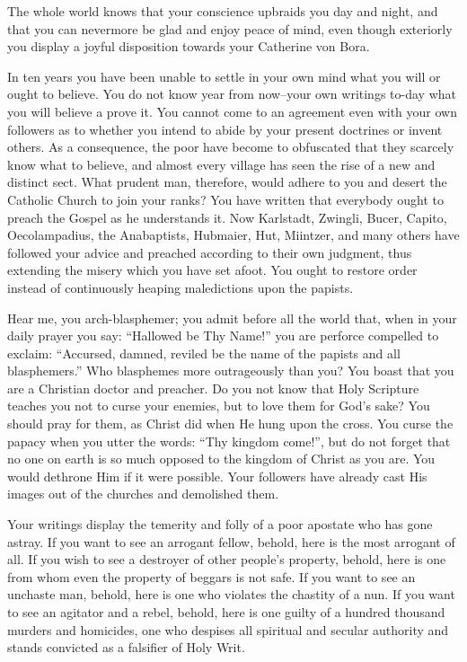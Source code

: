 The whole world knows that your conscience upbraids you day and night,
and that you can nevermore be glad and enjoy peace of mind, even though
exteriorly you display a joyful disposition towards your Catherine von Bora.

In ten years you have been unable to settle in your own mind what you
will or ought to believe. You do not know year from now--your own writings
to-day what you will believe a prove it. You cannot come to an agreement
even with your own followers as to whether you intend to abide by
your present doctrines or invent others. As a consequence, the poor have
become to obfuscated that they scarcely know what to believe, and
almost every village has seen the rise of a new and distinct sect. What
prudent man, therefore, would adhere to you and desert the Catholic Church to
join your ranks? You have written that everybody ought to preach the
Gospel as he understands it. Now Karlstadt, Zwingli, Bucer, Capito,
Oecolampadius, the Anabaptists, Hubmaier, Hut, Miintzer, and many
others have followed your advice and preached according to their own judgment, thus
extending the misery which you have set afoot. You ought to restore order
instead of continuously heaping maledictions upon the papists.

Hear me, you arch-blasphemer; you admit before all the world that, when
in your daily prayer you say: “Hallowed be Thy Name!” you are perforce
compelled to exclaim: “Accursed, damned, reviled be the name of the papists
and all blasphemers.” Who blasphemes more outrageously than you? You
boast that you are a Christian doctor and preacher. Do you not know that
Holy Scripture teaches you not to curse your enemies, but to love them for
God’s sake? You should pray for them, as Christ did when He hung upon the
cross. You curse the papacy when you utter the words: “Thy kingdom
come!”, but do not forget that no one on earth is so much opposed to the
kingdom of Christ as you are. You would dethrone Him if it were possible.
Your followers have already cast His images out of the churches and demolished
them.

Your writings display the temerity and folly of a poor apostate who has
gone astray. If you want to see an arrogant fellow, behold, here is the most
arrogant of all. If you wish to see a destroyer of other people’s property,
behold, here is one from whom even the property of beggars is not safe. If you
want to see an unchaste man, behold, here is one who violates the chastity of
a nun. If you want to see an agitator and a rebel, behold, here is one guilty
of a hundred thousand murders and homicides, one who despises all spiritual
and secular authority and stands convicted as a falsifier of Holy Writ.

